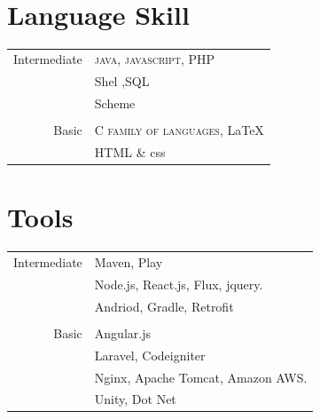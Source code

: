 \documentclass[10pt]{article} %
\begin{document}
{\begin{minipage}[t]{0.44\textwidth}
\begin{tabular}{rl}

\end{tabular}\\[10pt]


\section{Language Skill} 

\begin{tabular}{rl}
Intermediate 
& \textsc{java}, \textsc{javascript}, PHP\\
& Shel ,SQL\\
& Scheme \\
&\\
Basic 
& \textsc{C family of languages}, \LaTeX\\ 
&HTML \& css\\
\end{tabular}


\section{Tools} 

\begin{tabular}{rl}
	
Intermediate
& Maven, Play\\
& Node.js, React.js, Flux, jquery. \\
& Andriod, Gradle, Retrofit\\
& \\
Basic
& Angular.js\\
& Laravel, Codeigniter \\
& Nginx, Apache Tomcat,  Amazon AWS.\\
& Unity, Dot Net\\
\end{tabular}\\[10pt]



\end{minipage}}
\end{document}
